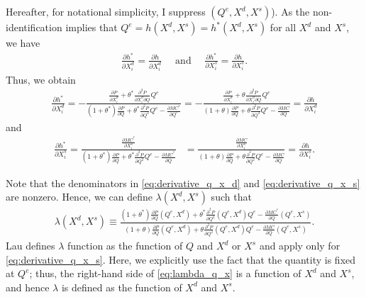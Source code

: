 \documentclass[11pt, a4paper]{article}
\theoremstyle{remark}
\begin{document}
 
Hereafter, for notational simplicity, I suppress $(Q^e, X^{d}, X^{s})$).
As the non-identification implies that $Q^e = h(X^{d}, X^{s}) = h^{*}(X^{d}, X^{s})$ for all $X^{d}$ and $X^{s}$, we have
\begin{align}
    \frac{\partial h^{*}}{\partial X^{d}_{i}}  = \frac{\partial h}{\partial X^{d}_{i}}\quad \text{  and  } \quad \frac{\partial h^{*}}{\partial X^{s}_{i}}  = \frac{\partial h}{\partial X^{s}_{i}}. \label{eq:observale_equivalence_derivative}
\end{align}
Thus, we obtain 
\begin{align}
     \frac{\partial h^{*}}{\partial X^{d}_{i}}  = - \frac{\frac{\partial P}{\partial X^{d}_{i}} + \theta^{*}\frac{\partial^2 P}{\partial X^{d}_{i}\partial Q}Q^e }{(1+\theta^{*})\frac{\partial P}{\partial Q} + \theta^{*}\frac{\partial^2 P}{\partial Q^2}Q^e - \frac{\partial MC^{*}}{\partial Q^e}} = - \frac{\frac{\partial P}{\partial X^{d}_{i}} + \theta \frac{\partial^2 P}{\partial X^{d}_{i}\partial Q}Q^e }{(1+\theta)\frac{\partial P}{\partial Q} + \theta\frac{\partial^2 P}{\partial Q^2}Q^e - \frac{\partial MC}{\partial Q}} =  \frac{\partial h}{\partial X^{d}_{i}} \label{eq:derivative_q_x_d}
\end{align}
and
\begin{align}
     \frac{\partial h^{*}}{\partial X^{s}_{i}} = \frac{\frac{\partial MC^{*}}{\partial X^{s}_{i}}}{(1+\theta^{*})\frac{\partial P}{\partial Q} + \theta^{*}\frac{\partial^2 P}{\partial Q^2}Q^e - \frac{\partial MC^{*}}{\partial Q}} & = \frac{\frac{\partial MC}{\partial X^{s}_{i}}}{(1+\theta)\frac{\partial P}{\partial Q} + \theta\frac{\partial^2 P}{\partial Q^2}Q^e - \frac{\partial MC}{\partial Q}} =  \frac{\partial h}{\partial X^{s}_{i}} .\label{eq:derivative_q_x_s}
\end{align}

Note that the denominators in \eqref{eq:derivative_q_x_d} and \eqref{eq:derivative_q_x_s} are nonzero.
Hence, we can define $\lambda(X^{d}, X^{s})$ such that
\begin{align}
    \lambda( X^{d}, X^{s}) \equiv \frac{(1+\theta^{*})\frac{\partial P}{\partial Q}(Q^e, X^{d}) + \theta^{*}\frac{\partial^2 P}{\partial Q^2}(Q^e, X^{d})Q^e - \frac{\partial MC^{*}}{\partial Q}(Q^e, X^{s})}{(1+\theta)\frac{\partial P}{\partial Q}(Q^e, X^{d}) + \theta\frac{\partial^2 P}{\partial Q^2}(Q^e, X^{d})Q^e - \frac{\partial MC}{\partial Q}(Q^e, X^{s})}.\label{eq:lambda_q_x}
\end{align}
Lau defines $\lambda$ function as the function of $Q$ and $X^{d}$ or $X^{s}$ and apply only for  \eqref{eq:derivative_q_x_s}.
Here, we explicitly use the fact that the quantity is fixed at $Q^e$; thus, the right-hand side of \eqref{eq:lambda_q_x} is a function of $X^{d}$ and $X^{s}$, and hence $\lambda$ is defined as the function of 
$X^{d}$ and $X^{s}$.
\end{document}
